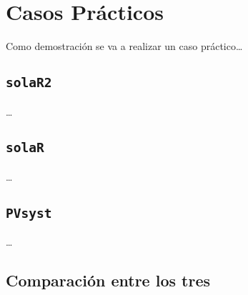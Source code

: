 \chapter{Casos Prácticos}

Como demostración se va a realizar un caso práctico\ldots{}

\section{\texttt{solaR2}}
\label{sec:org204ae31}

\ldots{}

\section{\texttt{solaR}}
\label{sec:orgcde0931}

\ldots{}

\section{\texttt{PVsyst}}
\label{sec:org51a207f}

\ldots{}

\section{Comparación entre los tres}
\label{sec:org163d87a}
